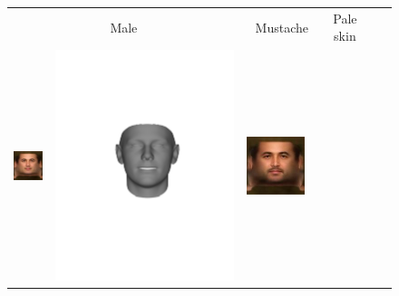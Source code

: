\begin{figure}[t!]
\begin{center}
\small
\setlength{\tabcolsep}{3pt}
\begin{tabular}{ @{\hskip 1.5mm}c@{}c@{\hskip 1.5mm}c@{}c@{}c@{}c@{}c@{\hskip 1.5mm}c@{}}
\multicolumn{2}{c}{Male} & \multicolumn{2}{c}{Mustache} & \multicolumn{2}{c}{Pale skin} \\
\includegraphics[width=\afifthcolumn]{img/representation/pred_tex_Male.jpg} &
\includegraphics[trim=150 250 150 250,clip, width=\afifthcolumn]{img/representation/pred_shape_Male.pdf} &
\includegraphics[width=\afifthcolumn]{img/representation/pred_tex_Mustache.jpg} &

\end{tabular}
\end{center}
\end{figure}
